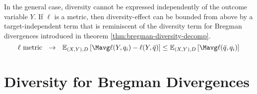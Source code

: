 \documentclass[../main.tex]{subfiles}
\begin{document}
In the general case, diversity cannot be expressed independently of the outcome variable $Y$. If $\ell$ is a metric, then diversity-effect can be bounded from above by a target-independent term that is reminiscent of the diversity term for Bregman divergences introduced in theorem \ref{thm:bregman-diversity-decomp}.
$$
\text{$\ell$ metric}  ~~\rightarrow~~ \mathbb{E}_{(X,Y), D}\left[ \Mavg \ell(Y, q_{i}) - \ell(Y, \bar{q}) \right] 
\leq \mathbb{E}_{(X,Y),D}\left[ \Mavg \ell(\bar{q}, q_{i}) \right] 
$$






\section{Diversity for Bregman Divergences} \label{sec:bregman-divergences}


\end{document}
